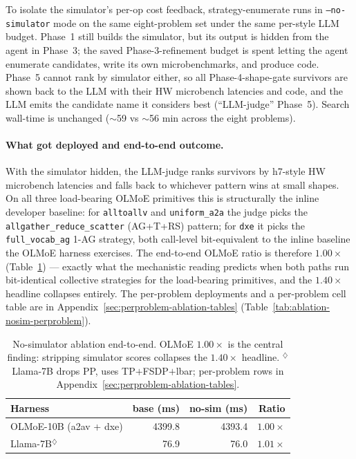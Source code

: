 To isolate the simulator's per-op cost feedback, strategy-enumerate
runs in \texttt{--no-simulator} mode on the same eight-problem set
under the same per-style LLM budget. Phase~1 still builds the
simulator, but its output is hidden from the agent in Phase~3;
the saved Phase-3-refinement budget is spent letting the agent
enumerate candidates, write its own microbenchmarks, and produce
code. Phase~5 cannot rank by simulator either, so all
Phase-4-shape-gate survivors are shown back to the LLM with their
HW microbench latencies and code, and the LLM emits the candidate
name it considers best (``LLM-judge'' Phase~5). Search wall-time
is unchanged ($\sim$59 vs $\sim$56 min across the eight problems).

\paragraph{What got deployed and end-to-end outcome.}
With the simulator hidden, the LLM-judge ranks survivors by h7-style
HW microbench latencies and falls back to whichever pattern wins at
small shapes. On all three load-bearing OLMoE primitives this is
structurally the inline developer baseline: for \texttt{alltoallv}
and \texttt{uniform\_a2a} the judge picks the
\texttt{allgather\_reduce\_scatter} (AG+T+RS) pattern; for
\texttt{dxe} it picks the \texttt{full\_vocab\_ag} 1-AG strategy,
both call-level bit-equivalent to the inline baseline the OLMoE
harness exercises. The end-to-end OLMoE ratio is therefore
$\mathbf{1.00\times}$ (Table~\ref{tab:ablation-nosim}) ---
exactly what the mechanistic reading predicts when both paths run
bit-identical collective strategies for the load-bearing
primitives, and the $1.40\times$ headline collapses entirely. The
per-problem deployments and a per-problem cell table are in
Appendix~\ref{sec:perproblem-ablation-tables} (Table~\ref{tab:ablation-nosim-perproblem}).

\begin{table}[!htbp]
\centering\footnotesize
\setlength{\tabcolsep}{3pt}
\begin{tabular}{lrrr}
\toprule
\textbf{Harness} & \textbf{base (ms)} & \textbf{no-sim (ms)} & \textbf{Ratio} \\
\midrule
OLMoE-10B (a2av + dxe)     & 4399.8 & 4393.4 & $\mathbf{1.00\times}$ \\
Llama-7B$^{\diamondsuit}$  & 76.9   & 76.0   & $1.01\times$ \\
\bottomrule
\end{tabular}
\caption{No-simulator ablation end-to-end. OLMoE $\mathbf{1.00\times}$
is the central finding: stripping simulator scores collapses the
$1.40\times$ headline. $^{\diamondsuit}$Llama-7B drops PP, uses
TP$+$FSDP$+$lbar; per-problem rows in
Appendix~\ref{sec:perproblem-ablation-tables}.}
\label{tab:ablation-nosim}
\end{table}


